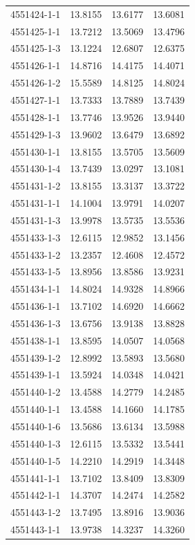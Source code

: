 \begin{longtable}{lrrr}
4551424-1-1 & 13.8155 & 13.6177 & 13.6081 \\
4551425-1-1 & 13.7212 & 13.5069 & 13.4796 \\
4551425-1-3 & 13.1224 & 12.6807 & 12.6375 \\
4551426-1-1 & 14.8716 & 14.4175 & 14.4071 \\
4551426-1-2 & 15.5589 & 14.8125 & 14.8024 \\
4551427-1-1 & 13.7333 & 13.7889 & 13.7439 \\
4551428-1-1 & 13.7746 & 13.9526 & 13.9440 \\
4551429-1-3 & 13.9602 & 13.6479 & 13.6892 \\
4551430-1-1 & 13.8155 & 13.5705 & 13.5609 \\
4551430-1-4 & 13.7439 & 13.0297 & 13.1081 \\
4551431-1-2 & 13.8155 & 13.3137 & 13.3722 \\
4551431-1-1 & 14.1004 & 13.9791 & 14.0207 \\
4551431-1-3 & 13.9978 & 13.5735 & 13.5536 \\
4551433-1-3 & 12.6115 & 12.9852 & 13.1456 \\
4551433-1-2 & 13.2357 & 12.4608 & 12.4572 \\
4551433-1-5 & 13.8956 & 13.8586 & 13.9231 \\
4551434-1-1 & 14.8024 & 14.9328 & 14.8966 \\
4551436-1-1 & 13.7102 & 14.6920 & 14.6662 \\
4551436-1-3 & 13.6756 & 13.9138 & 13.8828 \\
4551438-1-1 & 13.8595 & 14.0507 & 14.0568 \\
4551439-1-2 & 12.8992 & 13.5893 & 13.5680 \\
4551439-1-1 & 13.5924 & 14.0348 & 14.0421 \\
4551440-1-2 & 13.4588 & 14.2779 & 14.2485 \\
4551440-1-1 & 13.4588 & 14.1660 & 14.1785 \\
4551440-1-6 & 13.5686 & 13.6134 & 13.5988 \\
4551440-1-3 & 12.6115 & 13.5332 & 13.5441 \\
4551440-1-5 & 14.2210 & 14.2919 & 14.3448 \\
4551441-1-1 & 13.7102 & 13.8409 & 13.8309 \\
4551442-1-1 & 14.3707 & 14.2474 & 14.2582 \\
4551443-1-2 & 13.7495 & 13.8916 & 13.9036 \\
4551443-1-1 & 13.9738 & 14.3237 & 14.3260 \\

\end{longtable}
